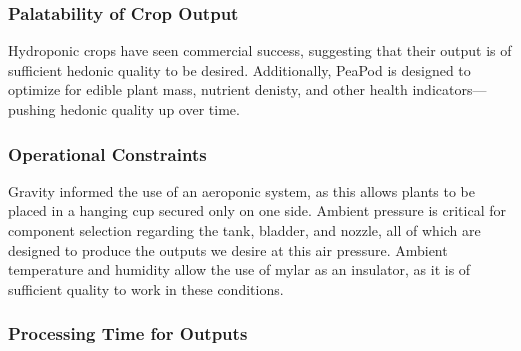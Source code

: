 \documentclass{report}
\begin{document}


\subsubsection{Palatability of Crop Output} 
\label{sec:constraints-palatability}




Hydroponic crops have seen commercial success, suggesting that their output is of sufficient hedonic quality to be desired. Additionally, PeaPod is designed to optimize for edible plant mass, nutrient denisty, and other health indicators---pushing hedonic quality up over time.

\subsubsection{Operational Constraints} 
\label{sec:constraints-operational}


Gravity informed the use of an aeroponic system, as this allows plants to be placed in a hanging cup secured only on one side. Ambient pressure is critical for component selection regarding the tank, bladder, and nozzle, all of which are designed to produce the outputs we desire at this air pressure. Ambient temperature and humidity allow the use of mylar as an insulator, as it is of sufficient quality to work in these conditions.

\subsubsection{Processing Time for Outputs} 
\label{sec:constraints-processing}
\end{document}
